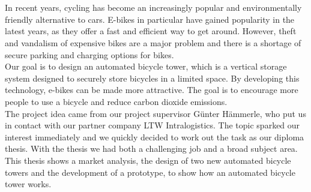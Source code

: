 \section*{}
In recent years, cycling has become an increasingly popular and environmentally friendly alternative to cars. E-bikes in particular have gained popularity in the latest years, as they offer a fast and efficient way to get around. However, theft and vandalism of expensive bikes are a major problem and there is a shortage of secure parking and charging options for bikes. \\
Our goal is to design an automated bicycle tower, which is a vertical storage system designed to securely store bicycles in a limited space. By developing this technology, e-bikes can be made more attractive. The goal is to encourage more people to use a bicycle and reduce carbon dioxide emissions.\\
The project idea came from our project supervisor Günter Hämmerle, who put us in contact with our partner company LTW Intralogistics. The topic sparked our interest immediately and we quickly decided to work out the task as our diploma thesis. With the thesis we had both a challenging job and a broad subject area. \\
This thesis shows a market analysis, the design of two new automated bicycle towers and the development of a prototype, to show how an automated bicycle tower works.\\
